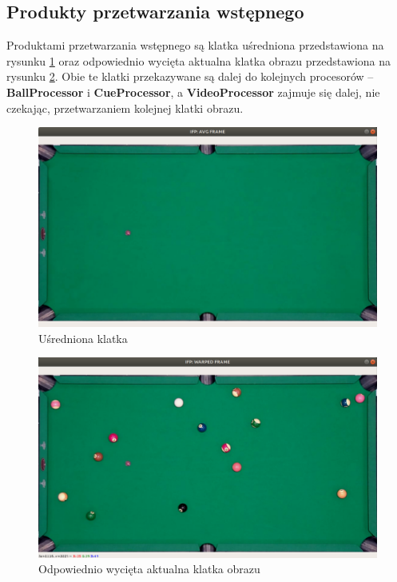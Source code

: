 \documentclass[12pt]{article}
\begin{document}
\subsection{Produkty przetwarzania wstępnego}

Produktami przetwarzania wstępnego są klatka uśredniona przedstawiona na rysunku \ref{avg_frame} oraz odpowiednio wycięta aktualna klatka obrazu przedstawiona na rysunku \ref{warped_frame}. Obie te klatki przekazywane są dalej do kolejnych procesorów – \textbf{BallProcessor} i \textbf{CueProcessor}, a \textbf{VideoProcessor} zajmuje się dalej, nie czekając, przetwarzaniem kolejnej klatki obrazu.

\newpage

\begin{figure}[!ht]
    \centering
    \includegraphics[width=15cm]{./images/obrazki/ifp/avg_frame.png}
    \caption{Uśredniona klatka}
    \label{avg_frame}
\end{figure}

\begin{figure}[!ht]
    \centering
    \includegraphics[width=15cm]{./images/obrazki/ifp/warped_frame.png}
    \caption{Odpowiednio wycięta aktualna klatka obrazu}
    \label{warped_frame}
\end{figure}
\end{document}
